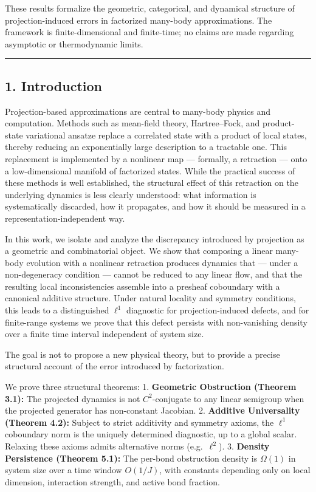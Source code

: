 \documentclass[
]{article}
\begin{document}
These results formalize the geometric, categorical, and dynamical
structure of projection-induced errors in factorized many-body
approximations. The framework is finite-dimensional and finite-time; no
claims are made regarding asymptotic or thermodynamic limits.

\begin{center}\rule{0.5\linewidth}{0.5pt}\end{center}

\subsection{1. Introduction}\label{introduction}

Projection-based approximations are central to many-body physics and
computation. Methods such as mean-field theory, Hartree--Fock, and
product-state variational ansatze replace a correlated state with a
product of local states, thereby reducing an exponentially large
description to a tractable one. This replacement is implemented by a
nonlinear map --- formally, a retraction --- onto a low-dimensional
manifold of factorized states. While the practical success of these
methods is well established, the structural effect of this retraction on
the underlying dynamics is less clearly understood: what information is
systematically discarded, how it propagates, and how it should be
measured in a representation-independent way.

In this work, we isolate and analyze the discrepancy introduced by
projection as a geometric and combinatorial object. We show that
composing a linear many-body evolution with a nonlinear retraction
produces dynamics that --- under a non-degeneracy condition --- cannot
be reduced to any linear flow, and that the resulting local
inconsistencies assemble into a presheaf coboundary with a canonical
additive structure. Under natural locality and symmetry conditions, this
leads to a distinguished \(\ell^1\) diagnostic for projection-induced
defects, and for finite-range systems we prove that this defect persists
with non-vanishing density over a finite time interval independent of
system size.

The goal is not to propose a new physical theory, but to provide a
precise structural account of the error introduced by factorization.

We prove three structural theorems: 1. \textbf{Geometric Obstruction
(Theorem 3.1):} The projected dynamics is not \(C^2\)-conjugate to any
linear semigroup when the projected generator has non-constant Jacobian.
2. \textbf{Additive Universality (Theorem 4.2):} Subject to strict
additivity and symmetry axioms, the \(\ell^1\) coboundary norm is the
uniquely determined diagnostic, up to a global scalar. Relaxing these
axioms admits alternative norms (e.g.~\(\ell^2\)). 3. \textbf{Density
Persistence (Theorem 5.1):} The per-bond obstruction density is
\(\Omega(1)\) in system size over a time window \(O(1/J)\), with
constants depending only on local dimension, interaction strength, and
active bond fraction.
\end{document}
